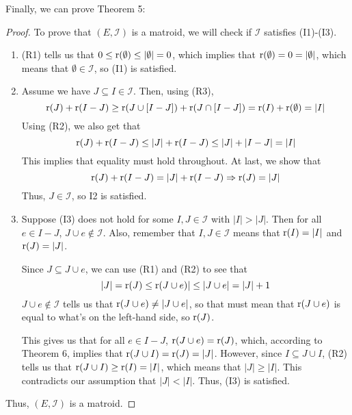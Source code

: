 Finally, we can prove Theorem 5:
\begin{proof}
    To prove that $(E,\mathcal{I})$ is a matroid, we will check if $\mathcal{I}$ satisfies (I1)-(I3).
    \begin{enumerate}
        \item (R1) tells us that $0\leq\operatorname{r}(\emptyset)\leq|\emptyset|=0$, which implies that $\operatorname{r}(\emptyset)=0=|\emptyset|$, which means that $\emptyset\in\mathcal{I}$, so (I1) is satisfied.
        \item Assume we have $J\subseteq I\in\mathcal{I}$. Then, using (R3),
        $$ \operatorname{r}(J)+\operatorname{r}(I-J) \geq \operatorname{r}(J\cup[I-J])+\operatorname{r}(J\cap[I-J]) = \operatorname{r}(I)+\operatorname{r}(\emptyset)=|I| $$
        Using (R2), we also get that
        $$ \operatorname{r}(J)+\operatorname{r}(I-J) \leq |J|+\operatorname{r}(I-J) \leq |J|+|I-J| = |I| $$
        This implies that equality must hold throughout. At last, we show that
        $$ \operatorname{r}(J)+\operatorname{r}(I-J) = |J|+\operatorname{r}(I-J) \Rightarrow \operatorname{r}(J)=|J| $$
        Thus, $J\in\mathcal{I}$, so {I2} is satisfied.
        
        \item Suppose (I3) does not hold for some $I,J\in\mathcal{I}$ with $|I|>|J|$. Then for all $e\in I-J$, $J\cup e\notin \mathcal{I}$. Also, remember that $I,J\in\mathcal{I}$ means that $\operatorname{r}(I)=|I|$ and $\operatorname{r}(J)=|J|$.

        Since $J\subseteq J\cup e$, we can use (R1) and (R2) to see that
        $$ |J|=\operatorname{r}(J)\leq\operatorname{r}(J\cup e)|\leq|J\cup e|=|J|+1 $$
        $J\cup e\notin \mathcal{I}$ tells us that $\operatorname{r}(J\cup e)\neq|J\cup e|$, so that must mean that $\operatorname{r}(J\cup e)$ is equal to what's on the left-hand side, so $\operatorname{r}(J)$.

        This gives us that for all $e\in I-J$, $\operatorname{r}(J\cup e)=\operatorname{r}(J)$, which, according to Theorem 6, implies that $\operatorname{r}(J\cup I)=\operatorname{r}(J)=|J|$. However, since $I\subseteq J\cup I$, (R2) tells us that $\operatorname{r}(J\cup I) \geq \operatorname{r}(I) = |I|$, which means that $|J|\geq|I|$. This contradicts our assumption that $|J|<|I|$. Thus, (I3) is satisfied.
    \end{enumerate}
    Thus, $(E,\mathcal{I})$ is a matroid.
\end{proof}

